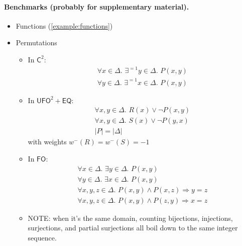 \documentclass{article}
\theoremstyle{definition}
\newcommand{\Ctwo}{$\mathsf{C}^{2}$}
\newcommand{\FO}{$\mathsf{FO}$}
\newcommand{\UFO}{$\mathsf{UFO}^{2} + \mathsf{EQ}$}
\begin{document}
\paragraph{Benchmarks (probably for supplementary material).}
\begin{itemize}
  \item Functions (\cref{example:functions})
  \item Permutations
        \begin{itemize}
          \item In \Ctwo:
                \begin{gather*}
                  \forall x \in \Delta\text{. }\exists^{=1} y \in \Delta\text{. }P(x, y)\\
                  \forall y \in \Delta\text{. }\exists^{=1} x \in \Delta\text{. }P(x, y)
                \end{gather*}
          \item In \UFO:
                \begin{gather*}
                  \forall x, y \in \Delta\text{. }R(x) \lor \neg P(x, y)\\
                  \forall x, y \in \Delta\text{. }S(x) \lor \neg P(y, x)\\
                  |P| = |\Delta|
                \end{gather*}
                with weights $w^{-}(R) = w^{-}(S) = -1$
          \item In \FO:
                \begin{gather*}
                  \forall x \in \Delta\text{. }\exists y \in \Delta\text{. }P(x, y)\\
                  \forall y \in \Delta\text{. }\exists x \in \Delta\text{. }P(x, y)\\
                  \forall x, y, z \in \Delta\text{. }P(x, y) \land P(x, z) \Rightarrow y = z\\
                  \forall x, y, z \in \Delta\text{. }P(x, y) \land P(z, y) \Rightarrow x = z
                \end{gather*}
          \item NOTE: when it's the same domain, counting bijections,
                injections, surjections, and partial surjections all boil down
                to the same integer sequence.
        \end{itemize}
\end{itemize}

\end{document}
